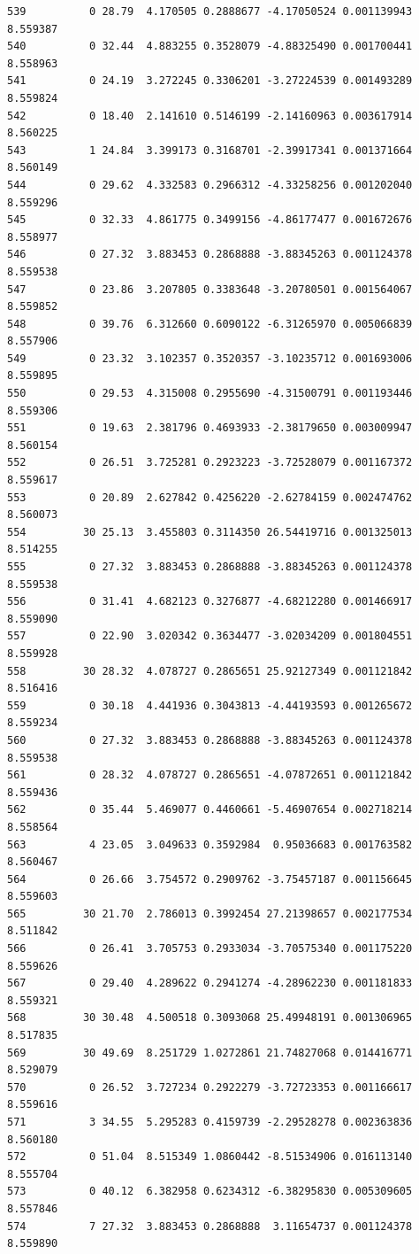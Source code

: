 \documentclass[]{book}
\theoremstyle{definition}
\theoremstyle{definition}
\theoremstyle{definition}
\theoremstyle{remark}
\begin{document}
\begin{verbatim}
539          0 28.79  4.170505 0.2888677 -4.17050524 0.001139943 8.559387
540          0 32.44  4.883255 0.3528079 -4.88325490 0.001700441 8.558963
541          0 24.19  3.272245 0.3306201 -3.27224539 0.001493289 8.559824
542          0 18.40  2.141610 0.5146199 -2.14160963 0.003617914 8.560225
543          1 24.84  3.399173 0.3168701 -2.39917341 0.001371664 8.560149
544          0 29.62  4.332583 0.2966312 -4.33258256 0.001202040 8.559296
545          0 32.33  4.861775 0.3499156 -4.86177477 0.001672676 8.558977
546          0 27.32  3.883453 0.2868888 -3.88345263 0.001124378 8.559538
547          0 23.86  3.207805 0.3383648 -3.20780501 0.001564067 8.559852
548          0 39.76  6.312660 0.6090122 -6.31265970 0.005066839 8.557906
549          0 23.32  3.102357 0.3520357 -3.10235712 0.001693006 8.559895
550          0 29.53  4.315008 0.2955690 -4.31500791 0.001193446 8.559306
551          0 19.63  2.381796 0.4693933 -2.38179650 0.003009947 8.560154
552          0 26.51  3.725281 0.2923223 -3.72528079 0.001167372 8.559617
553          0 20.89  2.627842 0.4256220 -2.62784159 0.002474762 8.560073
554         30 25.13  3.455803 0.3114350 26.54419716 0.001325013 8.514255
555          0 27.32  3.883453 0.2868888 -3.88345263 0.001124378 8.559538
556          0 31.41  4.682123 0.3276877 -4.68212280 0.001466917 8.559090
557          0 22.90  3.020342 0.3634477 -3.02034209 0.001804551 8.559928
558         30 28.32  4.078727 0.2865651 25.92127349 0.001121842 8.516416
559          0 30.18  4.441936 0.3043813 -4.44193593 0.001265672 8.559234
560          0 27.32  3.883453 0.2868888 -3.88345263 0.001124378 8.559538
561          0 28.32  4.078727 0.2865651 -4.07872651 0.001121842 8.559436
562          0 35.44  5.469077 0.4460661 -5.46907654 0.002718214 8.558564
563          4 23.05  3.049633 0.3592984  0.95036683 0.001763582 8.560467
564          0 26.66  3.754572 0.2909762 -3.75457187 0.001156645 8.559603
565         30 21.70  2.786013 0.3992454 27.21398657 0.002177534 8.511842
566          0 26.41  3.705753 0.2933034 -3.70575340 0.001175220 8.559626
567          0 29.40  4.289622 0.2941274 -4.28962230 0.001181833 8.559321
568         30 30.48  4.500518 0.3093068 25.49948191 0.001306965 8.517835
569         30 49.69  8.251729 1.0272861 21.74827068 0.014416771 8.529079
570          0 26.52  3.727234 0.2922279 -3.72723353 0.001166617 8.559616
571          3 34.55  5.295283 0.4159739 -2.29528278 0.002363836 8.560180
572          0 51.04  8.515349 1.0860442 -8.51534906 0.016113140 8.555704
573          0 40.12  6.382958 0.6234312 -6.38295830 0.005309605 8.557846
574          7 27.32  3.883453 0.2868888  3.11654737 0.001124378 8.559890

\end{verbatim}
\end{document}
